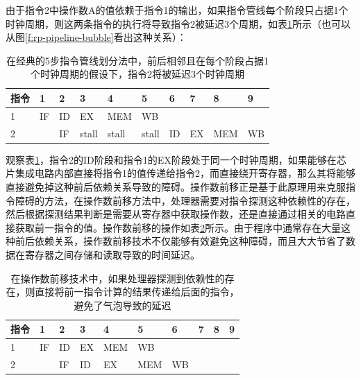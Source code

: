 由于指令2中操作数A的值依赖于指令1的输出，如果指令管线每个阶段只占据1个时钟周期，则这两条指令的执行将导致指令2被延迟3个周期，如表\ref{t:rp-pipeline-bubble}所示（也可以从图\ref{f:rp-pipeline-bubble}看出这种关系）：

\begin{table}
\caption{在经典的5步指令管线划分法中，前后相邻且在每个阶段占据1个时钟周期的假设下，指令2将被延迟3个时钟周期}
\label{t:rp-pipeline-bubble}

\begin{tabular}{p{}|p{}|p{}|p{}|p{}|p{}|p{}|p{}|p{}|p{}}
\hline 
   指令&1&2&3&4&5&6&7&8&9  \\
    \hline  
 1&IF&ID&EX&MEM&WB&&&&\\
 2&&IF&stall&stall&stall&ID&EX&MEM&WB\\
 \hline 
\end{tabular}
\end{table}

观察表\ref{t:rp-pipeline-bubble}，指令2的ID阶段和指令1的EX阶段处于同一个时钟周期，如果能够在芯片集成电路内部直接将指令1的值传递给指令2，而直接绕开寄存器，那么其将能够直接避免掉这种前后依赖关系导致的障碍。操作数前移正是基于此原理用来克服指令障碍的方法，在操作数前移方法中，处理器需要对指令探测这种依赖性的存在，然后根据探测结果判断是需要从寄存器中获取操作数，还是直接通过相关的电路直接获取前一指令的值。操作数前移的操作如表\ref{t:rp-operand-forwarding}所示。由于程序中通常存在大量这种前后依赖关系，操作数前移技术不仅能够有效避免这种障碍，而且大大节省了数据在寄存器之间存储和读取导致的时间延迟。

\begin{table}
\caption{在操作数前移技术中，如果处理器探测到依赖性的存在，则直接将前一指令计算的结果传递给后面的指令，避免了气泡导致的延迟}
\label{t:rp-operand-forwarding}

\begin{tabular}{p{}|p{}|p{}|p{}|p{}|p{}|p{}|p{}|p{}|p{}}
\hline 
   指令&1&2&3&4&5&6&7&8&9  \\
    \hline  
 1&IF&ID&EX&MEM&WB&&&&\\
 2&&IF&ID&EX&MEM&WB&&&\\
 \hline 
\end{tabular}
\end{table}



